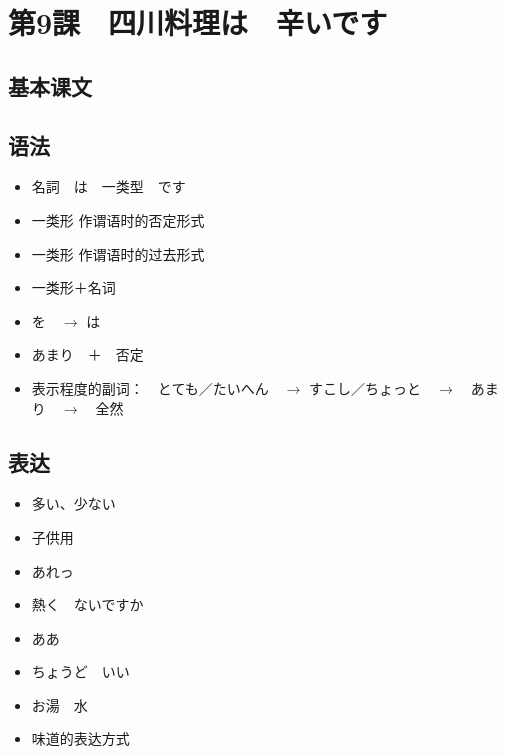 \section{第9課　四川料理は　辛いです}

\subsection{基本课文}

\subsection{语法}

\begin{itemize}
    \item 名詞　は　一类型　です
    \item 一类形 作谓语时的否定形式
    \item 一类形 作谓语时的过去形式
    \item 一类形＋名词
    \item を　$\rightarrow$ は
    \item あまり　＋　否定
    \item 表示程度的副词：　とても／たいへん　$\rightarrow$ すこし／ちょっと　$\rightarrow$　あまり　$\rightarrow$　全然
\end{itemize}


\subsection{表达}

\begin{itemize}
    \item 多い、少ない
    \item 子供用
    \item あれっ
    \item 熱く　ないですか
    \item ああ
    \item ちょうど　いい
    \item お湯　水
    \item 味道的表达方式
\end{itemize}
